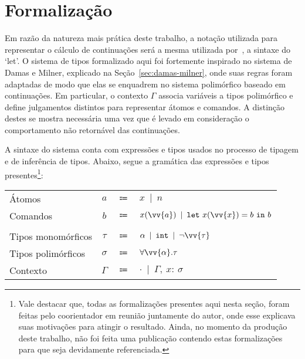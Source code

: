 \newcommand{\Mgu}{\ensuremath{\textit{mgu}}}
\newcommand{\MguList}{\ensuremath{\textit{mguList}}}
\newcommand{\UnifyVar}{\ensuremath{\textit{varBind}}}
\newcommand{\HeadSep}{\ensuremath{\textit{:}}}
\newcommand{\Length}{\ensuremath{\textit{length}}}
\newcommand{\List}{\ensuremath{\textit{list}}}


\section{Formalização}\label{sec:formalizacao}

Em razão da natureza mais prática deste trabalho, a notação utilizada para representar o cálculo de continuações será a mesma utilizada por~\cite{appel1997shrinking}, a sintaxe do `let'.
O sistema de tipos formalizado aqui foi fortemente inspirado no sistema de Damas e Milner, explicado na Seção~\ref{sec:damas-milner}, onde suas regras foram adaptadas de modo que elas se enquadrem no sistema polimórfico baseado em continuações.
Em particular, o contexto $\Gamma$ associa variáveis a tipos polimórfico e define julgamentos distintos para representar átomos e comandos.
A distinção destes se mostra necessária uma vez que é levado em consideração o comportamento não retornável das continuações. 

A sintaxe do sistema conta com expressões e tipos usados no processo de tipagem e de inferência de tipos.
Abaixo, segue a gramática das expressões e tipos presentes\footnote{Vale destacar que, todas as formalizações presentes aqui nesta seção, foram feitas pelo coorientador em reunião juntamente do autor, onde esse explicava suas motivações para atingir o resultado. Ainda, no momento da produção deste trabalho, não foi feita uma publicação contendo estas formalizações para que seja devidamente referenciada.}:

\phantom{Newline}

\begin{tabular}{lccl}
  Átomos & $a$ & $\Coloneqq$ & $x \enspace|\enspace n$ \\
  Comandos & $b$ & $\Coloneqq$ & $x(\vv{a}) \enspace|\enspace \mathtt{let}\ x(\vv{x}) = b\ \mathtt{in}\ b$ \\
  \\
  Tipos monomórficos & $\tau$ & $\Coloneqq$ & $\alpha \enspace|\enspace \mathtt{int} \enspace|\enspace \neg\vv{\tau}$ \\
  Tipos polimórficos & $\sigma$ & $\Coloneqq$ & $\forall\vv{\alpha}.\tau$ \\
  Contexto & $\Gamma$ & $\Coloneqq$ & $\cdot \enspace|\enspace \Gamma,\ x{:}\ \sigma$ \\
\end{tabular}\label{cps-type-system}

